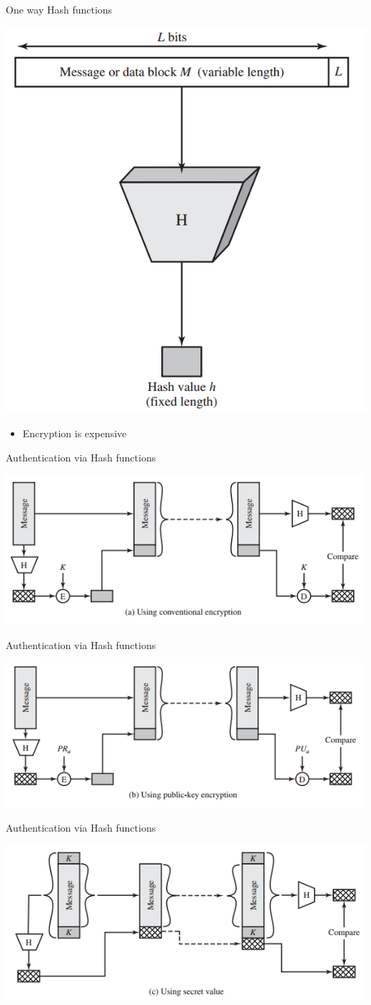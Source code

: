 \documentclass{beamer}
\begin{document}
\begin{frame}{One way Hash functions}
  \begin{center}
    \includegraphics[width=0.5\linewidth]{HASH}
  \end{center}
  \begin{itemize}
\item Encryption is expensive
  \end{itemize}
\end{frame}

\begin{frame}{Authentication via Hash functions}
  \begin{center}
    \includegraphics[width=0.7\linewidth]{AuthHASH1}
  \end{center}
\end{frame}
\begin{frame}{Authentication via Hash functions}
  \begin{center}
    \includegraphics[width=0.7\linewidth]{AuthHASH2}
  \end{center}
\end{frame}
\begin{frame}{Authentication via Hash functions}
  \begin{center}
    \includegraphics[width=0.7\linewidth]{AuthHASH3}
  \end{center}
\end{frame}
\end{document}
